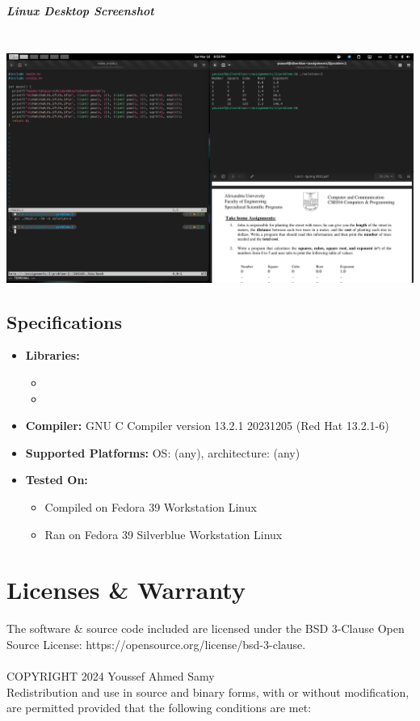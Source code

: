 \documentclass[a4paper,11pt]{article}
\theoremstyle{mytheor}
\begin{document}
\subparagraph{Linux Desktop Screenshot\\\\}
\includegraphics[width=1\linewidth,center]{desktop-2.png}
\newpage
\subsection{Specifications}
\begin{itemize}
    \item \textbf{Libraries:}
    \begin{itemize}
        \item \texttt{\color{inlinecode}{stdio.h}}
        \item \texttt{\color{inlinecode}{math.h}} 
    \end{itemize}
    \item \textbf{Compiler:} GNU C Compiler \texttt{\color{inlinecode}{(gcc)}} version 13.2.1 20231205 (Red Hat 13.2.1-6)
    \item \textbf{Supported Platforms:} OS: (any), architecture: (any)
    \item \textbf{Tested On:}
    \begin{itemize}
        \item Compiled on Fedora 39 Workstation Linux
        \item Ran on Fedora 39 Silverblue Workstation Linux
    \end{itemize}
\end{itemize}
\section{Licenses \& Warranty}
The software \& source code included are licensed under the BSD 3-Clause Open Source License: https://opensource.org/license/bsd-3-clause.\\\\
COPYRIGHT 2024 Youssef Ahmed Samy\\
Redistribution and use in source and binary forms, with or without modification, are permitted provided that the following conditions are met:
\end{document}
